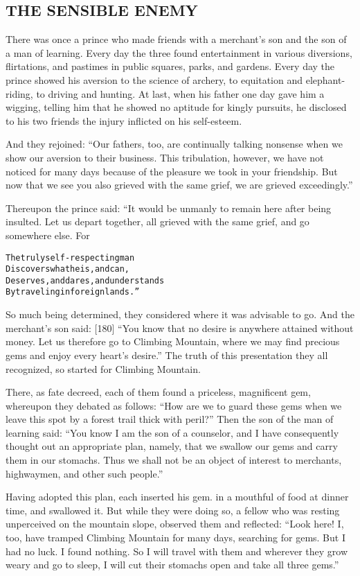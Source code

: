 \documentclass{article}
\renewenvironment{verbatim}{\begin{alltt}\normalfont\begin{centering}}{\end{centering}\end{alltt}}
\begin{document}
\subsection{THE SENSIBLE ENEMY}

There was once a prince who made friends with a merchant's son and
the son of a man of learning. Every day the three found
entertainment in various diversions, flirtations, and pastimes in
public squares, parks, and gardens. Every day the prince showed his
aversion to the science of archery, to equitation and
elephant-riding, to driving and hunting. At last, when his father
one day gave him a wigging, telling him that he showed no aptitude
for kingly pursuits, he disclosed to his two friends the injury
inflicted on his self-esteem.

And they rejoined:
``Our fathers, too, are continually talking nonsense when we show our aversion to their business. This tribulation, however, we have not noticed for many days because of the pleasure we took in your friendship. But now that we see you also grieved with the same grief, we are grieved exceedingly.''

Thereupon the prince said: “It would be unmanly to remain here
after being insulted. Let us depart together, all grieved with the
same grief, and go somewhere else. For

\begin{verbatim}
The truly self-respecting man
Discovers what he is, and can,
Deserves, and dares, and understands
By traveling in foreign lands.”
\end{verbatim}
So much being determined, they considered where it was advisable to
go. And the merchant's son said: [180]
``You know that no desire is anywhere attained without money. Let us therefore go to Climbing Mountain, where we may find precious gems and enjoy every heart's desire.''
The truth of this presentation they all recognized, so started for
Climbing Mountain.

There, as fate decreed, each of them found a priceless, magnificent
gem, whereupon they debated as follows:
``How are we to guard these gems when we leave this spot by a forest trail thick with peril?''
Then the son of the man of learning said:
``You know I am the son of a counselor, and I have consequently thought out an appropriate plan, namely, that we swallow our gems and carry them in our stomachs. Thus we shall not be an object of interest to merchants, highwaymen, and other such people.''

Having adopted this plan, each inserted his gem. in a mouthful of
food at dinner time, and swallowed it. But while they were doing
so, a fellow who was resting unperceived on the mountain slope,
observed them and reflected:
``Look here! I, too, have tramped Climbing Mountain for many days, searching for gems. But I had no luck. I found nothing. So I will travel with them and wherever they grow weary and go to sleep, I will cut their stomachs open and take all three gems.''
\end{document}
